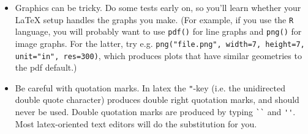 \begin{itemize}
    \item Graphics can be tricky. Do some tests early on, so you'll learn
        whether your LaTeX setup handles the graphs you make.  (For example, if
        you use the \texttt{R} language, you will probably want to use
        \texttt{pdf()} for line graphs and \texttt{png()} for image graphs.
        For the latter, try e.g.  \texttt{png("file.png", width=7, height=7,
        unit="in", res=300)}, which produces plots that have similar geometries
        to the pdf default.)

    \item Be careful with quotation marks. In latex the \verb|"|-key (i.e. the
        unidirected double quote character) produces double right quotation
        marks, and should never be used. Double quotation marks are produced by
        typing \verb|``| and \verb|''|. Most latex-oriented text editors will
        do the substitution for you.

\end{itemize}

